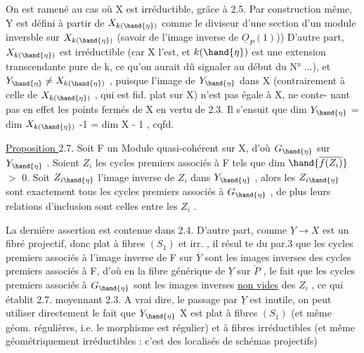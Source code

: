 
On est ramené au cas où X est irréductible, grâce à 2.5. Par construction
même, Y est défini à partir de $X_{k(\hand{\eta})}$ comme le diviseur d'une section
d'un module inversble sur $X_{k(\hand{\eta})}$ (savoir de l'image inverse de $\underline{O}_P(1)$))
D'autre part, $X_{k(\hand{\eta})}$ est irréductible (car X l'est, et $k(\hand{\eta})$ est une
\margin{|} extension transcendante pure de k, ce qu'on aurait dû signaler au début du
N° ...), et $Y_{\hand{\eta}} \neq X_{k(\hand{\eta})}$ , puisque l'image de $Y_{\hand{\eta}}$ dans X (contrairement
à celle de $X_{k(\hand{\eta})}$ , qui est fid. plat sur X) n'est pas égale à X, ne conte-%
nant pas en effet les points fermés de X en vertu de 2.3. Il s'ensuit que
dim $Y_{\hand{\eta}}$ = dim $X_{k(\hand{\eta})}$ -1  = dim X - 1 , cqfd.

\uline{Proposition }2.7. Soit F un Module quasi-cohérent sur X, d'où $G_{\hand{\eta}}$ sur $Y_{\hand{\eta}}$ .
Soient $Z_i$ les cycles premiers associés à F tels que dim $\hand{\overline{f(Z_i)}}$ $>$ 0. Soit
$Z_{i\hand{\eta}}$ l'image inverse de $Z_i$ dans $Y_{\hand{\eta}}$ , alors les $Z_{i\hand{\eta}}$ sont exactement tous
les cycles premiers associés à $G_{\hand{\eta}}$ , de plus leurs relations d'inclusion
sont celles entre les $Z_i$ .

La dernière assertion est contenue dans 2.4. D'autre part, comme
$\underline{Y} \rightarrow X$ est un fibré projectif, donc plat à fibres $(S_1)$ et irr. , il résul
te du par.3 que les cycles premiers associés à l'image inverse  de F sur
$\overline{Y}$ sont les images inverses  des cycles premiers associés à F,
d'où en   la fibre générique  de $\underline{Y}$ sur $\check{P}$ , le fait que les
cycles premiers associés à $G_{\hand{\eta}}$ sont les images inverses \uline{non vides} des $Z_i$ ,
ce qui établit 2.7. moyennant 2.3. A vrai dire, le passage par $\underline{Y}$ est
inutile, on peut utiliser directement le fait que $Y_{\hand{\eta}}$ \hand{$\longrightarrow$} X est plat à
fibres $(S_1)$ (et même géom. régulières, i.e. le morphisme est régulier)
et à fibres irréductibles (et même géométriquement irréductibles : c'est
des localisés de schémas projectifs)\hand{;} 

